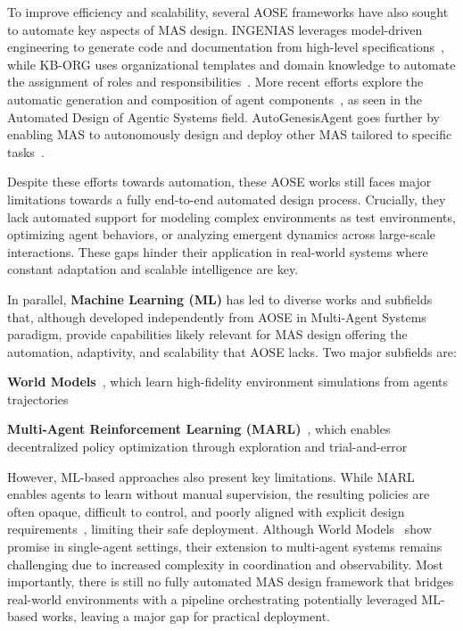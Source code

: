 \documentclass[pdflatex,sn-mathphys-num]{sn-jnl}%
\theoremstyle{thmstyleone}%
\theoremstyle{thmstyletwo}%
\theoremstyle{thmstylethree}%
\begin{document}
To improve efficiency and scalability, several AOSE frameworks have also sought to automate key aspects of MAS design. INGENIAS leverages model-driven engineering to generate code and documentation from high-level specifications~\cite{Pavon2003}, while KB-ORG uses organizational templates and domain knowledge to automate the assignment of roles and responsibilities~\cite{Sims2008}. More recent efforts explore the automatic generation and composition of agent components~\cite{smith2024automated}, as seen in the Automated Design of Agentic Systems field. AutoGenesisAgent goes further by enabling MAS to autonomously design and deploy other MAS tailored to specific tasks~\cite{harper2024autogenesisagent}.

Despite these efforts towards automation, these AOSE works still faces major limitations towards a fully end-to-end automated design process. Crucially, they lack automated support for modeling complex environments as test environments, optimizing agent behaviors, or analyzing emergent dynamics across large-scale interactions. These gaps hinder their application in real-world systems where constant adaptation and scalable intelligence are key.

In parallel, \textbf{Machine Learning (ML)} has led to diverse works and subfields that, although developed independently from AOSE in Multi-Agent Systems paradigm, provide capabilities likely relevant for MAS design offering the automation, adaptivity, and scalability that AOSE lacks. Two major subfields are:
\begin{enumerate*}[label={\roman*)}, itemjoin={; \quad}]
    \item \textbf{World Models}~\cite{Ha2018}, which learn high-fidelity environment simulations from agents trajectories
    \item \textbf{Multi-Agent Reinforcement Learning (MARL)}~\cite{Zhang2021, Papoudakis2021}, which enables decentralized policy optimization through exploration and trial-and-error
\end{enumerate*}

However, ML-based approaches also present key limitations. While MARL enables agents to learn without manual supervision, the resulting policies are often opaque, difficult to control, and poorly aligned with explicit design requirements~\cite{Nguyen2020, Du2022}, limiting their safe deployment.
Although World Models~\cite{Ha2018} show promise in single-agent settings, their extension to multi-agent systems remains challenging due to increased complexity in coordination and observability.
Most importantly, there is still no fully automated MAS design framework that bridges real-world environments with a pipeline orchestrating potentially leveraged ML-based works, leaving a major gap for practical deployment.
\end{document}
